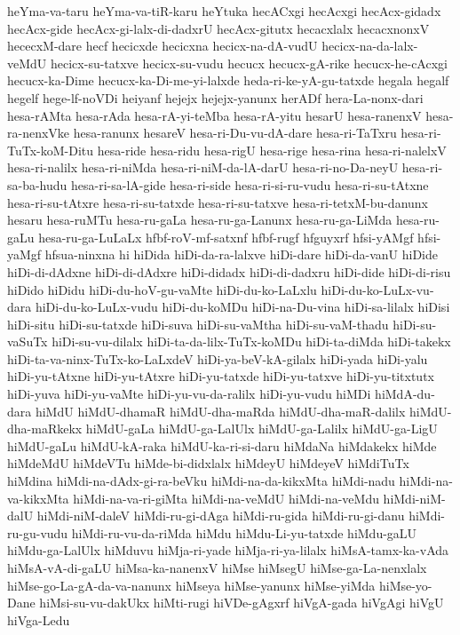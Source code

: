 {heYma-va-taru
heYma-va-tiR-karu
heYtuka
hecACxgi
hecAcxgi
hecAcx-gidadx
hecAcx-gide
hecAcx-gi-lalx-di-dadxrU
hecAcx-gitutx
hecacxlalx
hecacxnonxV
hececxM-dare
hecf
hecicxde
hecicxna
hecicx-na-dA-vudU
hecicx-na-da-lalx-veMdU
hecicx-su-tatxve
hecicx-su-vudu
hecucx
hecucx-gA-rike
hecucx-he-cAcxgi
hecucx-ka-Dime
hecucx-ka-Di-me-yi-lalxde
heda-ri-ke-yA-gu-tatxde
hegala
hegalf
hegelf
hege-lf-noVDi
heiyanf
hejejx
hejejx-yanunx
herADf
hera-La-nonx-dari
hesa-rAMta
hesa-rAda
hesa-rA-yi-teMba
hesa-rA-yitu
hesarU
hesa-ranenxV
hesa-ra-nenxVke
hesa-ranunx
hesareV
hesa-ri-Du-vu-dA-dare
hesa-ri-TaTxru
hesa-ri-TuTx-koM-Ditu
hesa-ride
hesa-ridu
hesa-rigU
hesa-rige
hesa-rina
hesa-ri-nalelxV
hesa-ri-nalilx
hesa-ri-niMda
hesa-ri-niM-da-lA-darU
hesa-ri-no-Da-neyU
hesa-ri-sa-ba-hudu
hesa-ri-sa-lA-gide
hesa-ri-side
hesa-ri-si-ru-vudu
hesa-ri-su-tAtxne
hesa-ri-su-tAtxre
hesa-ri-su-tatxde
hesa-ri-su-tatxve
hesa-ri-tetxM-bu-danunx
hesaru
hesa-ruMTu
hesa-ru-gaLa
hesa-ru-ga-Lanunx
hesa-ru-ga-LiMda
hesa-ru-gaLu
hesa-ru-ga-LuLaLx
hfbf-roV-mf-satxnf
hfbf-rugf
hfguyxrf
hfsi-yAMgf
hfsi-yaMgf
hfsua-ninxna
hi
hiDida
hiDi-da-ra-lalxve
hiDi-dare
hiDi-da-vanU
hiDide
hiDi-di-dAdxne
hiDi-di-dAdxre
hiDi-didadx
hiDi-di-dadxru
hiDi-dide
hiDi-di-risu
hiDido
hiDidu
hiDi-du-hoV-gu-vaMte
hiDi-du-ko-LaLxlu
hiDi-du-ko-LuLx-vu-dara
hiDi-du-ko-LuLx-vudu
hiDi-du-koMDu
hiDi-na-Du-vina
hiDi-sa-lilalx
hiDisi
hiDi-situ
hiDi-su-tatxde
hiDi-suva
hiDi-su-vaMtha
hiDi-su-vaM-thadu
hiDi-su-vaSuTx
hiDi-su-vu-dilalx
hiDi-ta-da-lilx-TuTx-koMDu
hiDi-ta-diMda
hiDi-takekx
hiDi-ta-va-ninx-TuTx-ko-LaLxdeV
hiDi-ya-beV-kA-gilalx
hiDi-yada
hiDi-yalu
hiDi-yu-tAtxne
hiDi-yu-tAtxre
hiDi-yu-tatxde
hiDi-yu-tatxve
hiDi-yu-titxtutx
hiDi-yuva
hiDi-yu-vaMte
hiDi-yu-vu-da-ralilx
hiDi-yu-vudu
hiMDi
hiMdA-du-dara
hiMdU
hiMdU-dhamaR
hiMdU-dha-maRda
hiMdU-dha-maR-dalilx
hiMdU-dha-maRkekx
hiMdU-gaLa
hiMdU-ga-LalUlx
hiMdU-ga-Lalilx
hiMdU-ga-LigU
hiMdU-gaLu
hiMdU-kA-raka
hiMdU-ka-ri-si-daru
hiMdaNa
hiMdakekx
hiMde
hiMdeMdU
hiMdeVTu
hiMde-bi-didxlalx
hiMdeyU
hiMdeyeV
hiMdiTuTx
hiMdina
hiMdi-na-dAdx-gi-ra-beVku
hiMdi-na-da-kikxMta
hiMdi-nadu
hiMdi-na-va-kikxMta
hiMdi-na-va-ri-giMta
hiMdi-na-veMdU
hiMdi-na-veMdu
hiMdi-niM-dalU
hiMdi-niM-daleV
hiMdi-ru-gi-dAga
hiMdi-ru-gida
hiMdi-ru-gi-danu
hiMdi-ru-gu-vudu
hiMdi-ru-vu-da-riMda
hiMdu
hiMdu-Li-yu-tatxde
hiMdu-gaLU
hiMdu-ga-LalUlx
hiMduvu
hiMja-ri-yade
hiMja-ri-ya-lilalx
hiMsA-tamx-ka-vAda
hiMsA-vA-di-gaLU
hiMsa-ka-nanenxV
hiMse
hiMsegU
hiMse-ga-La-nenxlalx
hiMse-go-La-gA-da-va-nanunx
hiMseya
hiMse-yanunx
hiMse-yiMda
hiMse-yo-Dane
hiMsi-su-vu-dakUkx
hiMti-rugi
hiVDe-gAgxrf
hiVgA-gada
hiVgAgi
hiVgU
hiVga-Ledu
}
